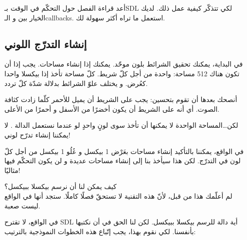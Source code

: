 أعد قراءة الفصل حول التحكّم في الوقت بـ\textenglish{SDL}
لكي تتذكّر كيفية عمل ذلك. لديك الخيار بين
و الـ\textenglish{callbacks}.
استعمل ما تراه أكثر سهولة لك.

\subsection{إنشاء التدرّج اللوني}

في البداية، يمكنك تحقيق الشرائط بلون موحّد. يمكنك إذا إنشاء مساحات. يجب إذا أن تكون هناك 512 مساحة: واحدة من أجل كلّ شريط. كلّ مساحة تأخذ إذا بيكسلا واحدا كعُرض. و يختلف علوّ الشرائط بدلالة شدّة كلّ تردد.

أنصحك بعدها أن تقوم بتحسين: يجب على الشريط أن يميل للأحمر كلّما زادت كثافة الصوت. أي أنه على الشريط أن يكون أخضرًا من الأسفل و أحمرًا من الأعلى.

\begin{question}
لكن\dots المساحة الواحدة لا يمكنها أن تأخذ سوى لونٍ واحدٍ لو عندما نستعمل الدالة
.
لا يمكننا إنشاء تدرّح لوني!
\end{question}

في الواقع، يمكننا بالتأكيد إنشاء مساحات بعَرْض 1 بيكسل و عُلُو 1 بيكسل من أجل كلّ لون في التدرّج. لكن هذا سيأخذ بنا إلى إنشاء مساحات عديدة و لن يكون التحكّم فيها مثاليًا!

كيف يمكن لنا أن نرسم بيكسلا ببيكسل؟\\
لم أعلّمك هذا من قبل، لأنّ هذه التقنية لا تستحقّ فصلًا كاملًا. ستجد أنها في الواقع ليست صعبة. 

في الواقع، لا تقترح \textenglish{SDL}
أية دالة للرسم بيكسلا ببيكسل. لكن لنا الحق في أن نكتبها بأنفسنا. لكي نقوم بهذا، يجب إتّباع هذه الخطوات النموذجية بالترتيب:

